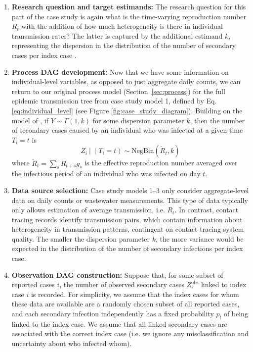\documentclass{article}
\begin{document}
\begin{enumerate}
   \item \textbf{Research question and target estimands:} The research question for this part of the case study is again what is the time-varying reproduction number $R_t$ with the addition of how much heterogeneity is there in individual transmission rates? The latter is captured by the additional estimand $k$, representing the dispersion in the distribution of the number of secondary cases per index case \citep{lloyd2005superspreading}. 
   
    \item \textbf{Process DAG development:} Now that we have some information on individual-level variables, as opposed to just aggregate daily counts, we can return to our original process model (Section~\ref{sec:process}) for the full epidemic transmission tree from case study model 1, defined by Eq. \eqref{eq:individual_level} (see Figure \ref{fig:case_study_diagram}). 
    Building on the model of \citet{lloyd2005superspreading}, if $Y\sim \Gamma(1,k)$ for some dispersion parameter $k$, then the number of secondary cases caused by an individual who was infected at a given time $T_i=t$ is
     \begin{equation} \label{eq:offspring_dist}
        Z_i \ | \ (T_i=t) \sim \mathrm{NegBin}\left( \tilde{R}_{t}, k\right)
    \end{equation}   
    where $\tilde{R}_t= \sum_s R_{t+s} g_s$ is the effective reproduction number averaged over the infectious period of an individual who was infected on day $t$.
   
    \item \textbf{Data source selection:} Case study models 1--3 only consider aggregate-level data on daily counts or wastewater measurements. This type of data typically only allows estimation of average transmission, i.e. $R_t$. In contrast, contact tracing records identify transmission pairs, which contain information about heterogeneity in transmission patterns, contingent on contact tracing system quality. The smaller the dispersion parameter $k$, the more variance would be expected in the distribution of the number of secondary infections per index case.
    
    \item \textbf{Observation DAG construction:} Suppose that, for some subset of reported cases $i$, the number of observed secondary cases $Z^\mathrm{obs}_i$ linked to index case $i$ is recorded. For simplicity, we assume that the index cases for whom these data are available are a randomly chosen subset of all reported cases, and each secondary infection independently has a fixed probability $p_l$ of being linked to the index case. We assume that all linked secondary cases are associated with the correct index case (i.e. we ignore any misclassification and uncertainty about who infected whom). 


\end{enumerate}
\end{document}
